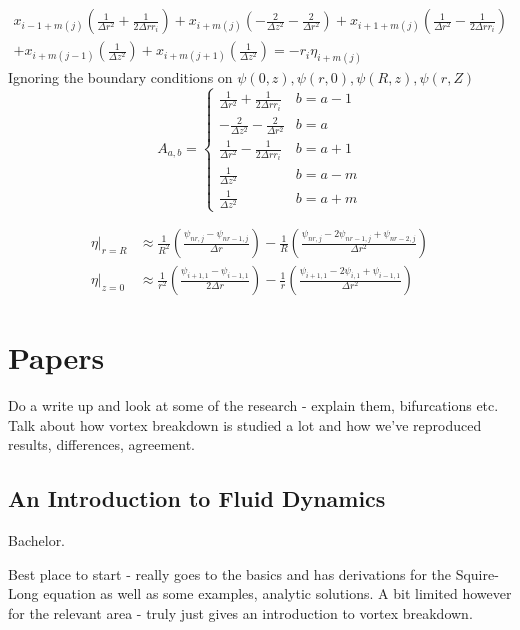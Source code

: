 \documentclass{X:/Documents/Coding/Latex/myreport}
\begin{document}
\begin{align*}
        x_{i-1+m(j)}\left(\frac{1}{\Delta r^2} + \frac{1}{2\Delta r r_i}\right) + x_{i+m(j)} \left(-\frac{2}{\Delta z^2} - \frac{2}{\Delta r^2}\right) + x_{i+1+m(j)} \left(\frac{1}{\Delta r^2} - \frac{1}{2\Delta r r_i}\right)\\
        + x_{i+m(j-1)} \left(\frac{1}{\Delta z^2}\right) + x_{i+m(j+1)}\left(\frac{1}{\Delta z^2}\right) = -r_i \eta_{i+m(j)}
\end{align*}
Ignoring the boundary conditions on $\psi(0,z), \psi(r,0), \psi(R,z), \psi(r,Z)$
\[A_{a,b} = \begin{cases}
    \frac{1}{\Delta r^2} + \frac{1}{2\Delta r r_i}  & b = a - 1 \\
    -\frac{2}{\Delta z^2} - \frac{2}{\Delta r^2}    & b = a \\
    \frac{1}{\Delta r^2} - \frac{1}{2\Delta r r_i}  & b = a + 1 \\
    \frac{1}{\Delta z^2}                            & b = a - m \\
    \frac{1}{\Delta z^2}                            & b = a + m 
\end{cases}\]


\begin{align*}
    \eta|_{r=R} &\approx \frac{1}{R^2}\left(\frac{\psi_{nr,j} - \psi_{nr-1,j}}{\Delta r}\right) - \frac{1}{R} \left(\frac{\psi_{nr,j} - 2\psi_{nr-1,j} + \psi_{nr-2,j}}{\Delta r^2}\right) \\
    \eta|_{z=0} &\approx  \frac{1}{r^2} \left(\frac{\psi_{i+1,1} - \psi_{i-1,1}}{2\Delta r}\right) - \frac{1}{r} \left(\frac{\psi_{i+1,1} - 2 \psi_{i,1} + \psi_{i-1,1}}{\Delta r^2}\right)
\end{align*}





\section{Papers}


Do a write up and look at some of the research - explain them, bifurcations etc.
Talk about how vortex breakdown is studied a lot and how we've reproduced results, differences, agreement.


\subsection{An Introduction to Fluid Dynamics}
Bachelor.

Best place to start - really goes to the basics and has derivations for the Squire-Long equation as well as some examples, analytic solutions.
A bit limited however for the relevant area - truly just gives an introduction to vortex breakdown.
\end{document}
